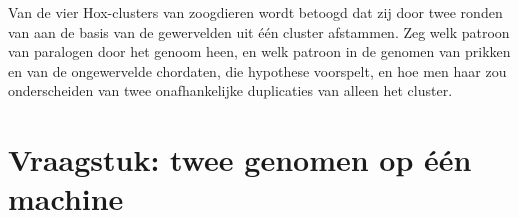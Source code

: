 \begin{exercise}[$\star\star\star$]\label{exo:b3:genomics:12}
Van de vier Hox-clusters van zoogdieren wordt betoogd dat zij door twee
ronden van  aan de basis van de gewervelden
uit één cluster afstammen. Zeg welk patroon van paralogen door het
genoom heen, en welk patroon in de genomen van prikken en van de
ongewervelde chordaten, die hypothese voorspelt, en hoe men haar zou
onderscheiden van twee onafhankelijke duplicaties van alleen het
cluster.
\end{exercise}

\section{Vraagstuk: twee genomen op één machine}

